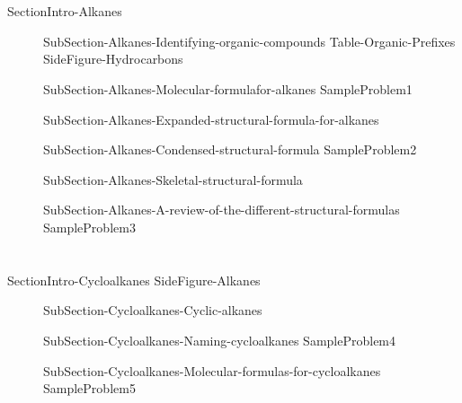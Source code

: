 \documentclass[main.tex]{subfiles}
\begin{document}
\section{\color{blue!30!black}{Alkanes}}
{SectionIntro-Alkanes}
\sloppy\begin{description}
\item[]{SubSection-Alkanes-Identifying-organic-compounds}
{Table-Organic-Prefixes}
{SideFigure-Hydrocarbons}
\item[]{SubSection-Alkanes-Molecular-formulafor-alkanes}
{SampleProblem1}
\item[] {SubSection-Alkanes-Expanded-structural-formula-for-alkanes}
 \newpage\vspace{5cm}{Table-Alkane-names}
\item[]{SubSection-Alkanes-Condensed-structural-formula}
{SampleProblem2}
\item[]{SubSection-Alkanes-Skeletal-structural-formula}
\item[]{SubSection-Alkanes-A-review-of-the-different-structural-formulas}
{SampleProblem3}
\hspace{-5cm}{Figure-Skeletal-expanded-molecular}

\end{description}






\section{\color{blue!30!black}{Cycloalkanes}}
{SectionIntro-Cycloalkanes}
{SideFigure-Alkanes}

\sloppy\begin{description}

\item[] {SubSection-Cycloalkanes-Cyclic-alkanes}
\item[]{SubSection-Cycloalkanes-Naming-cycloalkanes}
{SampleProblem4}
\item[]{SubSection-Cycloalkanes-Molecular-formulas-for-cycloalkanes}
{SampleProblem5}
\end{description}
\end{document}
